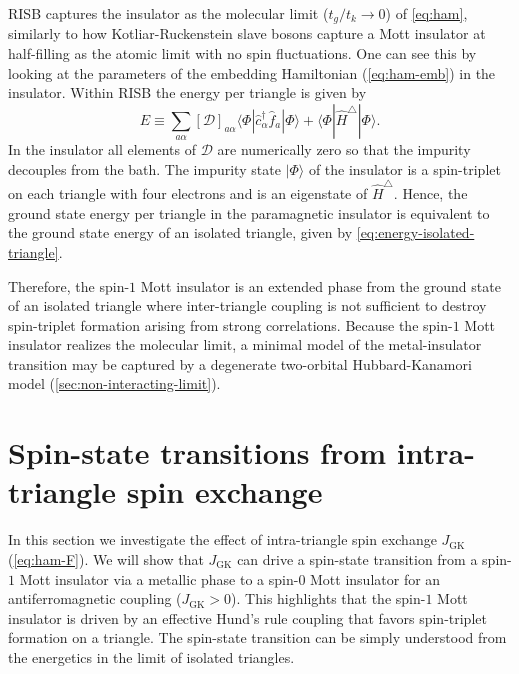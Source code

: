 \documentclass[reprint,aps,prb,amsmath,amssymb]{revtex4-2}
\begin{document}
RISB captures the insulator as the molecular limit ($t_g / t_k \rightarrow 0$) of \cref{eq:ham}, similarly to how Kotliar-Ruckenstein slave bosons capture a Mott insulator at half-filling as the atomic limit with no spin fluctuations. One can see this by looking at the parameters of the embedding Hamiltonian (\cref{eq:ham-emb}) in the insulator. Within RISB the energy per triangle is given by
%
\begin{equation} \label{eq:energy}
	E \equiv \sum_{a\alpha} [\bm{\mathcal{D}}]_{a\alpha} \langle \Phi | \hat{c}_{\alpha}^{\dagger} \hat{f}_{a}^{} | \Phi \rangle + \langle \Phi | \hat{H}^{\triangle} | \Phi \rangle.
\end{equation}
%
In the insulator all elements of $\bm{\mathcal{D}}$ are numerically zero so that the impurity decouples from the bath. The impurity state $|\Phi \rangle$ of the insulator is a spin-triplet on each triangle with four electrons and is an eigenstate of $\hat{H}^{\triangle}$. Hence, the ground state energy per triangle in the paramagnetic insulator is equivalent to the ground state energy of an isolated triangle, given by \cref{eq:energy-isolated-triangle}.

Therefore, the spin-$1$ Mott insulator is an extended phase from the ground state of an isolated triangle where inter-triangle coupling is not sufficient to destroy spin-triplet formation arising from strong correlations. Because the spin-$1$ Mott insulator realizes the molecular limit, a minimal model of the metal-insulator transition may be captured by a degenerate two-orbital Hubbard-Kanamori model (\cref{sec:non-interacting-limit}).

\section{Spin-state transitions from intra-triangle spin exchange} \label{sec:spin-state-transitions}

In this section we investigate the effect of intra-triangle spin exchange $J_{\mathrm{GK}}$ (\cref{eq:ham-F}). We will show that $J_{\mathrm{GK}}$ can drive a spin-state transition from a spin-$1$ Mott insulator via a metallic phase to a spin-$0$ Mott insulator for an antiferromagnetic coupling ($J_{\mathrm{GK}} > 0$). This highlights that the spin-$1$ Mott insulator is driven by an effective Hund's rule coupling that favors spin-triplet formation on a triangle. The spin-state transition can be simply understood from the energetics in the limit of isolated triangles.
\end{document}
